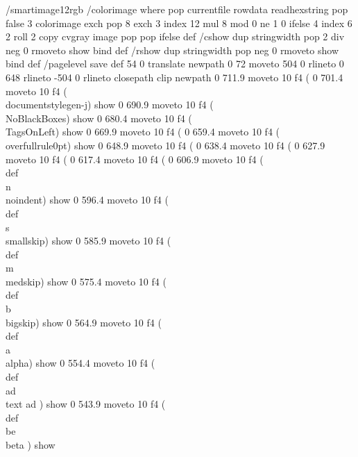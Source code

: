 /smartimage12rgb { %
    /colorimage where {
	pop
	{ currentfile rowdata readhexstring pop }
	false 3
	colorimage
    } {
	exch pop 8 exch
	3 index 12 mul 8 mod 0 ne { 1 } { 0 } ifelse
	4 index
	6 2 roll
	{ 2 copy cvgray }
	image
	pop pop
    } ifelse
} def
/cshow { dup stringwidth pop 2 div neg 0 rmoveto show } bind def
/rshow { dup stringwidth pop neg 0 rmoveto show } bind def
/pagelevel save def
54 0 translate
newpath 0 72 moveto 504 0 rlineto 0 648 rlineto -504 0 rlineto  closepath clip newpath
0 711.9 moveto
10 f4
(%
0 701.4 moveto
10 f4
(\\documentstyle{gen-j}) show
0 690.9 moveto
10 f4
(\\NoBlackBoxes) show
0 680.4 moveto
10 f4
(\\TagsOnLeft) show
0 669.9 moveto
10 f4
(%
0 659.4 moveto
10 f4
(\\overfullrule0pt) show
0 648.9 moveto
10 f4
(%
0 638.4 moveto
10 f4
(%
0 627.9 moveto
10 f4
(%
0 617.4 moveto
10 f4
(%
0 606.9 moveto
10 f4
(\\def \\n {\\noindent}) show
0 596.4 moveto
10 f4
(\\def \\s {\\smallskip}) show
0 585.9 moveto
10 f4
(\\def \\m {\\medskip}) show
0 575.4 moveto
10 f4
(\\def \\b {\\bigskip}) show
0 564.9 moveto
10 f4
(\\def \\a {\\alpha}) show
0 554.4 moveto
10 f4
(\\def \\ad {{\\text {ad}}} ) show
0 543.9 moveto
10 f4
(\\def \\be {\\beta} ) show
